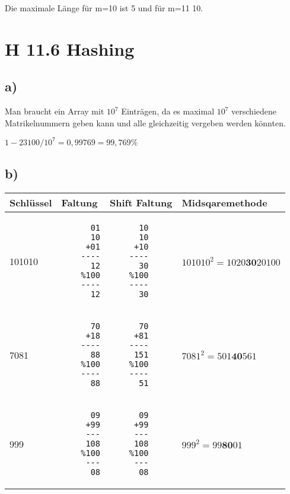 \documentclass[a4paper]{article}
\begin{document}
Die maximale Länge für m=10 ist 5 und für m=11 10.

\section*{H 11.6 Hashing}

\subsection*{a)}

Man braucht ein Array mit $10^7$ Einträgen, da es maximal $10^7$
verschiedene Matrikelnummern geben kann und alle gleichzeitig vergeben
werden könnten.

$1 - 23100 / 10^7 = 0,99769 = 99,769\%$

\subsection*{b)}

\begin{tabular}[h!]{|l| m{1.5cm} | m{2cm} |l|}
	\hline
	Schlüssel & Faltung & Shift Faltung & Midsqaremethode \\
	\hline
	101010    & 
	\begin{verbatim}
	  01
	  10
	 +01
	----
	  12
	%100
	----
	  12
	\end{verbatim}
	&
	\begin{verbatim}
	  10
	  10
	 +10
	----
	  30
	%100
	----
	  30
	\end{verbatim}
	&
	$101010^2 = 1020\textbf{30}20100$ \\

	\hline

	7081 &
	\begin{verbatim}
	  70
	 +18
	----
	  88
	%100
	----
	  88
	\end{verbatim}
	&
	\begin{verbatim}
	  70
	 +81
	----
	 151 
	%100
	----
	  51
	\end{verbatim}
	&
	$7081^2 = 501\textbf{40}561$ \\
	
	\hline

	999 &
	\begin{verbatim}
	  09
	 +99
	 ---
	 108
	%100
	 ---
	  08
	\end{verbatim}
	&
	\begin{verbatim}
	  09
	 +99
	 ---
	 108
	%100
	 ---
	  08
	\end{verbatim}
	&
	$999^2 = 99\textbf{80}01$ \\
	\hline
\end{tabular}
\end{document}
